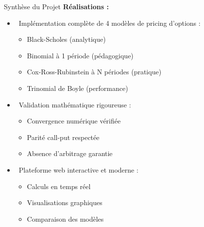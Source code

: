 \documentclass[aspectratio=169, 10pt]{beamer}
\begin{document}
\begin{frame}{Synthèse du Projet}
    \textbf{Réalisations :}
    \begin{itemize}
        \item {} \ Implémentation complète de 4 modèles de pricing d'options :
        \begin{itemize}
            \item Black-Scholes (analytique)
            \item Binomial à 1 période (pédagogique)
            \item Cox-Ross-Rubinstein à N périodes (pratique)
            \item Trinomial de Boyle (performance)
        \end{itemize}
        \item {} \ Validation mathématique rigoureuse :
        \begin{itemize}
            \item Convergence numérique vérifiée
            \item Parité call-put respectée
            \item Absence d'arbitrage garantie
        \end{itemize}
        \item {} \ Plateforme web interactive et moderne :
        \begin{itemize}
            \item Calculs en temps réel
            \item Visualisations graphiques
            \item Comparaison des modèles
        \end{itemize}
    \end{itemize}
\end{frame}
\end{document}
